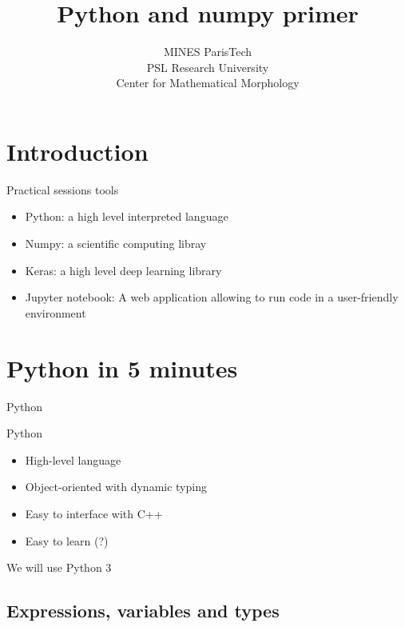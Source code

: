 \documentclass[xcolor=pdftex,dvipsnames,table,mathserif]{beamer}
\title{Python and numpy primer}
\author{}
\date{MINES ParisTech\\
  PSL Research University\\
  Center for Mathematical Morphology
}
\begin{document}
\section*{Introduction}


\begin{frame}{Practical sessions tools}

\begin{itemize}
\item Python: a high level interpreted language
\item Numpy: a scientific computing libray
\item Keras: a high level deep learning library
\item Jupyter notebook: A web application allowing to run code in a user-friendly environment
\end{itemize}

\end{frame}

\section{Python in 5 minutes}

\begin{frame}{Python}

  \begin{block}{Python}
    \begin{itemize}
    \item High-level language
    \item Object-oriented with dynamic typing
    \item Easy to interface with C++
    \item Easy to learn (?)
    \end{itemize}
  \end{block}

\begin{alertblock}{}
  We will use Python 3
\end{alertblock}

\end{frame}

\subsection{Expressions, variables and types}
\end{document}
